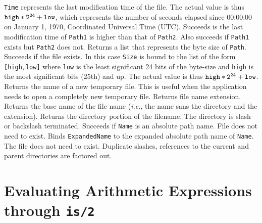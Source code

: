 \begin{description}
  {\tt Time} represents the last modification time of the file.
  The actual value is thus $\tt high*2^{24} + low$, which represents the
  number of seconds elapsed since 00:00:00 on
       January 1, 1970, Coordinated Universal Time (UTC).
  Succeeds is the last modification time of {\tt Path1} is higher than that
  of {\tt Path2}. Also succeeds if {\tt Path1} exists but {\tt Path2} does
  not.
  Returns a list that represents the byte size of {\tt Path}.
  Succeeds if the file exists. In this case {\tt Size} is bound to the list
  of the form {\tt [high,low]} where {\tt low} is the least significant 24
  bits of the byte-size and {\tt high} is the most significant bits (25th)
  and up. The actual value is thus $\tt high*2^{24} + low$.
  Returns the name of a new temporary file. This is useful when the
  application needs to open a completely new temporary file.
  Returns file name extension.
  Returns the base name of the file name ({\it i.e.}, the name sans the
  directory and the extension).
  Returns the directory portion of the filename. The directory is slash or
  backslash terminated.
  Succeeds if {\tt Name} is an absolute path name. File does not need to exist.
  Binds {\tt ExpandedName} to the expanded absolute path name of {\tt Name}.
  The file does not need to exist. Duplicate slashes, references to the
  current and parent directories are factored out.
\end{description}

\section{Evaluating Arithmetic Expressions through {\tt is/2}}
\label{Arithmetic} 


